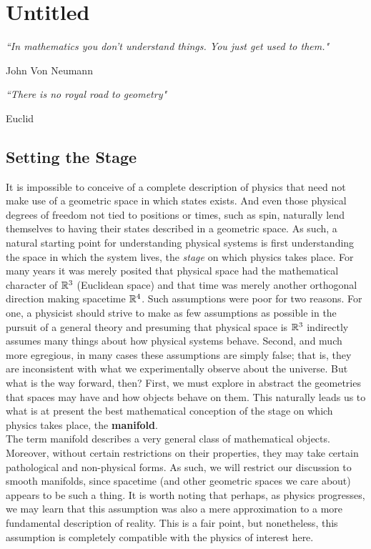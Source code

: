 \chapter{Untitled}
\epigraph{\textit{``In mathematics you don't understand things. You just get used to them."}}{John Von Neumann}
\epigraph{\textit{``There is no royal road to geometry"}}{Euclid}
\section*{Setting the Stage}

It is impossible to conceive of a complete description of physics that need not make use of a geometric space in which states exists.  And even those physical degrees of freedom not tied to positions or times, such as spin, naturally lend themselves to having their states described in a geometric space.  As such, a natural starting point for understanding physical systems is first understanding the space in which the system lives, the \textit{stage} on which physics takes place.  For many years it was merely posited that physical space had the mathematical character of $\mathbb{R}^3$ (Euclidean space) and that time was merely another orthogonal direction making spacetime $\mathbb{R}^4$.  Such assumptions were poor for two reasons.  For one, a physicist should strive to make as few assumptions as possible in the pursuit of a general theory and presuming that physical space is $\mathbb{R}^3$ indirectly assumes many things about how physical systems behave. Second, and much more egregious, in many cases these assumptions are simply false; that is, they are inconsistent with what we experimentally observe about the universe.  But what is the way forward, then?  First, we must explore in abstract the geometries that spaces may have and how objects behave on them.  This naturally leads us to what is at present the best mathematical conception of the stage on which physics takes place, the \textbf{manifold}.\\

The term manifold describes a very general class of mathematical objects.  Moreover, without certain restrictions on their properties, they may take certain pathological and non-physical forms.  As such, we will restrict our discussion to smooth manifolds, since spacetime (and other geometric spaces we care about) appears to be such a thing.  It is worth noting that perhaps, as physics progresses, we may learn that this assumption was also a mere approximation to a more fundamental description of reality.  This is a fair point, but nonetheless, this assumption is completely compatible with the physics of interest here. \\

